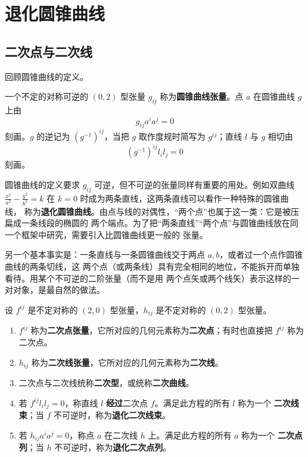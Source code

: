 \chapter{退化圆锥曲线}

\section{二次点与二次线}

回顾圆锥曲线的定义。

\begin{definition}[圆锥曲线]
一个不定的对称可逆的 $(0,2)$ 型张量 $g_{ij}$ 称为\textbf{圆锥曲线张量}。点 $a$ 在圆锥曲线 $g$ 上由
\[
g_{ij}a^ia^j=0
\]
刻画。$g$ 的逆记为 $(g^{-1})^{ij}$，当把 $g$ 取作度规时简写为 $g^{ij}$；直线 $l$ 与 $g$ 相切由
\[
(g^{-1})^{ij}l_il_j=0
\]
刻画。
\end{definition}

圆锥曲线的定义要求 $g_{ij}$ 可逆，但不可逆的张量同样有重要的用处。例如双曲线
$\frac{x^2}{a^2}-\frac{y^2}{b^2}=k$ 在 $k=0$ 时成为两条直线，这两条直线可以看作一种特殊的圆锥曲线，
称为\textbf{退化圆锥曲线}。由点与线的对偶性，“两个点”也属于这一类：它是被压扁成一条线段的椭圆的
两个端点。为了把“两条直线”“两个点”与圆锥曲线放在同一个框架中研究，需要引入比圆锥曲线更一般的
张量。

另一个基本事实是：一条直线与一条圆锥曲线交于两点 $a,b$，或者过一个点作圆锥曲线的两条切线，这
两个点（或两条线）具有完全相同的地位，不能拆开而单独看待。用某个不可逆的二阶张量（而不是用
两个点矢或两个线矢）表示这样的一对对象，是最自然的做法。

\begin{definition}[二次点与二次线]
设 $f^{ij}$ 是不定对称的 $(2,0)$ 型张量，$h_{ij}$ 是不定对称的 $(0,2)$ 型张量。
\begin{enumerate}[label=(\arabic*),leftmargin=2.4em]
\item $f^{ij}$ 称为\textbf{二次点张量}，它所对应的几何元素称为\textbf{二次点}；有时也直接把
$f^{ij}$ 称为二次点。
\item $h_{ij}$ 称为\textbf{二次线张量}，它所对应的几何元素称为\textbf{二次线}。
\item 二次点与二次线统称\textbf{二次型}，或统称\textbf{二次曲线}。
\item 若 $f^{ij}l_il_j=0$，称直线 $l$ \textbf{经过}二次点 $f$。满足此方程的所有 $l$ 称为一个
\textbf{二次线束}；当 $f$ 不可逆时，称为\textbf{退化二次线束}。
\item 若 $h_{ij}a^ia^j=0$，称点 $a$ 在二次线 $h$ 上。满足此方程的所有 $a$ 称为一个
\textbf{二次点列}；当 $h$ 不可逆时，称为\textbf{退化二次点列}。
\end{enumerate}
\end{definition}

